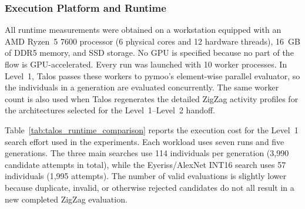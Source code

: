 \subsubsection{Execution Platform and Runtime}

All runtime measurements were obtained on a workstation equipped with
an AMD Ryzen~5 7600 processor (6 physical cores and 12 hardware
threads), 16~GB of DDR5 memory, and SSD storage. No GPU is specified
because no part of the flow is GPU-accelerated. Every run was launched
with 10 worker processes. In Level~1, Talos passes these workers to
pymoo's element-wise parallel evaluator, so the individuals in a
generation are evaluated concurrently. The same worker count
is also used when Talos regenerates the detailed ZigZag activity
profiles for the architectures selected for the Level~1--Level~2
handoff.

Table~\ref{tab:talos_runtime_comparison} reports the execution cost for
the Level~1 search effort used in the experiments. Each workload uses
seven runs and five generations. The three main searches use 114
individuals per generation (3,990 candidate attempts in total), while
the Eyeriss/AlexNet INT16 search uses 57 individuals (1,995 attempts).
The number of valid evaluations is slightly lower because duplicate,
invalid, or otherwise rejected candidates do not all result in a new
completed ZigZag evaluation.

